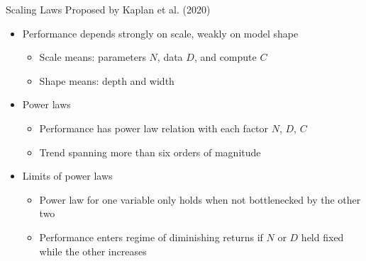 \begin{vbframe}{Scaling Laws Proposed by Kaplan et al. (2020)}
\href{https://arxiv.org/abs/2001.08361}{} 

\vfill

\begin{itemize}

	\item Performance depends strongly on scale, weakly on model shape
	\begin{itemize}
	\item Scale means: parameters $N$, data $D$, and compute $C$
	\item Shape means: depth and width
	\end{itemize}

	\item Power laws
	\begin{itemize}
	\item Performance has power law relation with each factor $N$, $D$, $C$
	\item Trend spanning more than six orders of magnitude
	\end{itemize}

	\item Limits of power laws
	\begin{itemize}
	\item Power law for one variable only holds when not bottlenecked by the other two 
	\item Performance enters regime of diminishing returns if $N$ or $D$ held fixed while the other increases
	\end{itemize}

\end{itemize}

\vfill

\end{vbframe}


